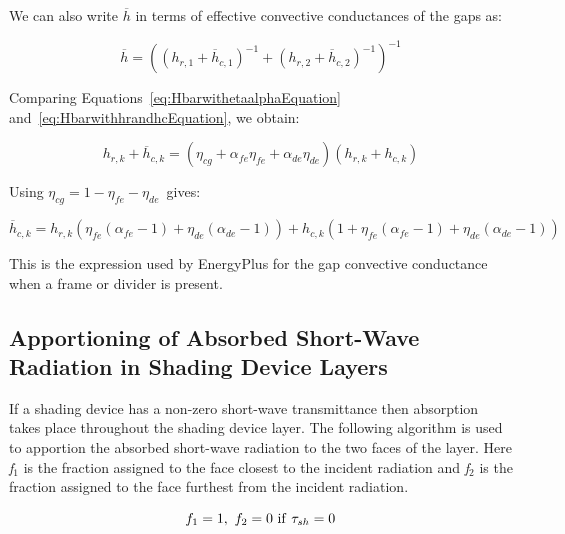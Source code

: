 We can also write \(\overline h\) in terms of effective convective conductances of the gaps as:

\begin{equation}
\overline h  = {\left( {{{\left( {{h_{r,1}} + {{\overline h }_{c,1}}} \right)}^{ - 1}} + {{\left( {{h_{r,2}} + {{\overline h }_{c,2}}} \right)}^{ - 1}}} \right)^{ - 1}}
\label{eq:HbarwithhrandhcEquation}
\end{equation}

Comparing Equations~\ref{eq:HbarwithetaalphaEquation} and~\ref{eq:HbarwithhrandhcEquation}, we obtain:

\begin{equation}
{h_{r,k}} + {\overline h_{c,k}} = \left( {{\eta_{cg}} + {\alpha_{fe}}{\eta_{fe}} + {\alpha_{de}}{\eta_{de}}} \right)\left( {{h_{r,k}} + {h_{c,k}}} \right)
\end{equation}

Using \({\eta_{cg}} = 1 - {\eta_{fe}} - {\eta_{de}}\)~gives:

\begin{equation}
{\overline h_{c,k}} = {h_{r,k}}\left( {{\eta_{fe}}\left( {{\alpha_{fe}} - 1} \right) + {\eta_{de}}\left( {{\alpha_{de}} - 1} \right)} \right) + {h_{c,k}}\left( {1 + {\eta_{fe}}\left( {{\alpha_{fe}} - 1} \right) + {\eta_{de}}\left( {{\alpha_{de}} - 1} \right)} \right)
\end{equation}

This is the expression used by EnergyPlus for the gap convective conductance when a frame or divider is present.

\subsection{Apportioning of Absorbed Short-Wave Radiation in Shading Device Layers}\label{apportioning-of-absorbed-short-wave-radiation-in-shading-device-layers}

If a shading device has a non-zero short-wave transmittance then absorption takes place throughout the shading device layer. The following algorithm is used to apportion the absorbed short-wave radiation to the two faces of the layer. Here \emph{f\(_{1}\)} is the fraction assigned to the face closest to the incident radiation and \emph{f\(_{2}\)} is the fraction assigned to the face furthest from the incident radiation.

\begin{equation}
{f_1} = 1,~{\rm{ }}{f_2} = 0{\rm{~if~}}{\tau_{sh}} = 0
\end{equation}

